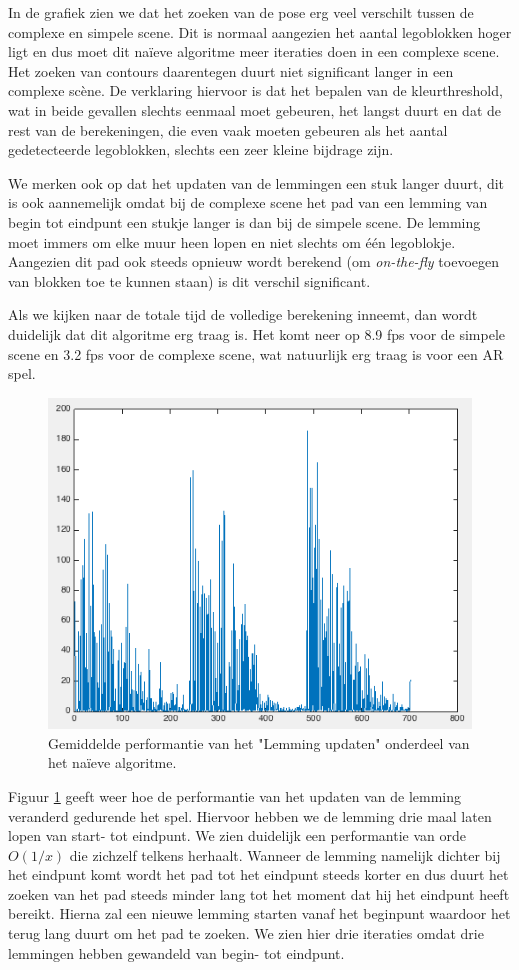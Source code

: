 In de grafiek zien we dat het zoeken van de pose erg veel verschilt tussen de complexe en simpele scene. Dit is normaal aangezien het aantal legoblokken hoger ligt en dus moet dit na\"ieve algoritme meer iteraties doen in een complexe scene. Het zoeken van contours daarentegen duurt niet significant langer in een complexe sc\`ene. De verklaring hiervoor is dat het bepalen van de kleurthreshold, wat in beide gevallen slechts eenmaal moet gebeuren, het langst duurt en dat de rest van de berekeningen, die even vaak moeten gebeuren als het aantal gedetecteerde legoblokken, slechts een zeer kleine bijdrage zijn. 

We merken ook op dat het updaten van de lemmingen een stuk langer duurt, dit is ook aannemelijk omdat bij de complexe scene het pad van een lemming van begin tot eindpunt een stukje langer is dan bij de simpele scene. De lemming moet immers om elke muur heen lopen en niet slechts om \'e\'en legoblokje. Aangezien dit pad ook steeds opnieuw wordt berekend (om \textit{on-the-fly} toevoegen van blokken toe te kunnen staan) is dit verschil significant.

Als we kijken naar de totale tijd de volledige berekening inneemt, dan wordt duidelijk dat dit algoritme erg traag is. Het komt neer op 8.9 fps voor de simpele scene en 3.2 fps voor de complexe scene, wat natuurlijk erg traag is voor een AR spel.

\begin{figure}
  \centering
  \includegraphics[width=.75\linewidth]{img/naiveLemmPerf}
  \caption{Gemiddelde performantie van het "Lemming updaten" onderdeel van het na\"ieve algoritme.}
  \label{fig:naive_lemm_perf}
\end{figure}

Figuur \ref{fig:naive_lemm_perf} geeft weer hoe de performantie van het updaten van de lemming veranderd gedurende het spel. Hiervoor hebben we de lemming drie maal laten lopen van start- tot eindpunt. We zien duidelijk een performantie van orde $O(1/x)$ die zichzelf telkens herhaalt. Wanneer de lemming namelijk dichter bij het eindpunt komt wordt het pad tot het eindpunt steeds korter en dus duurt het zoeken van het pad steeds minder lang tot het moment dat hij het eindpunt heeft bereikt. Hierna zal een nieuwe lemming starten vanaf het beginpunt waardoor het terug lang duurt om het pad te zoeken. We zien hier drie iteraties omdat drie lemmingen hebben gewandeld van begin- tot eindpunt.

